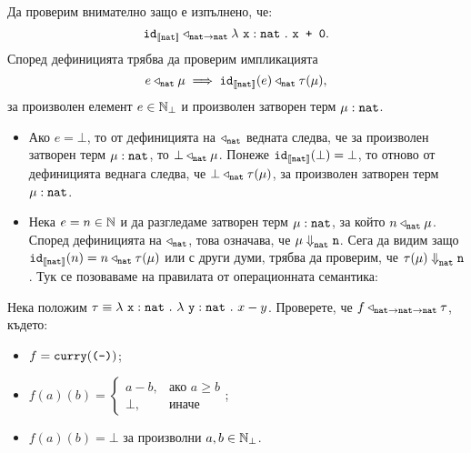 \begin{example}
  Да проверим внимателно защо е изпълнено, че:
  \[\texttt{id}_{\val{\nat}} \triangleleft_{\arr{nat}{nat}} \lamb{x}{nat}{\vv{x + 0}}.\]
  Според дефиницията трябва да проверим импликацията
  \[e \triangleleft_{\nat} \mu \implies \texttt{id}_{\val{\nat}}(e) \triangleleft_{\nat} \tau(\mu),\]
  за произволен елемент $e \in \Nat_\bot$ и произволен затворен терм $\mu : \nat$.
  \begin{itemize}
  \item
    Ако $e = \bot$, то от дефиницията на $\triangleleft_{\nat}$ ведната следва, че за произволен затворен терм $\mu : \nat$, то
    $\bot \triangleleft_{\nat} \mu$. Понеже $\texttt{id}_{\val{\nat}}(\bot) = \bot$, то отново от дефиницията веднага следва, че
    $\bot \triangleleft_{\nat} \tau(\mu)$, за произволен затворен терм $\mu : \nat$.
  \item
    Нека $e = n\in\Nat$ и да разгледаме затворен терм $\mu : \nat$, за който $n \triangleleft_{\nat} \mu$.
    Според дефиницията на $\triangleleft_{\nat}$, това означава, че $\mu \opsem{}{nat} \vv{n}$.
    Сега да видим защо $\texttt{id}_{\val{\nat}}(n) = n \triangleleft_{\nat} \tau(\mu)$ или с други думи,
    трябва да проверим, че $\tau(\mu) \opsem{}{nat} \vv{n}$. Тук се позоваваме на правилата от операционната семантика:
    \begin{prooftree}
    \end{prooftree}
  \end{itemize}

\end{example}

\begin{problem}
  Нека положим $\tau \equiv \lamb{x}{nat}{\lamb{y}{nat}{x-y}}$.
  Проверете, че $f \triangleleft_{\nat\to\nat\to\nat} \tau$, където:
  \begin{itemize}
  \item
    $f = \curry(\minus)$;
  \item
    $f(a)(b) =
    \begin{cases}
      a-b, & \text{ако }a \geq b\\
      \bot, & \text{иначе}
    \end{cases}$;
  \item
    $f(a)(b) = \bot$ за произволни $a,b\in\Nat_\bot$.
  \end{itemize}
\end{problem}


